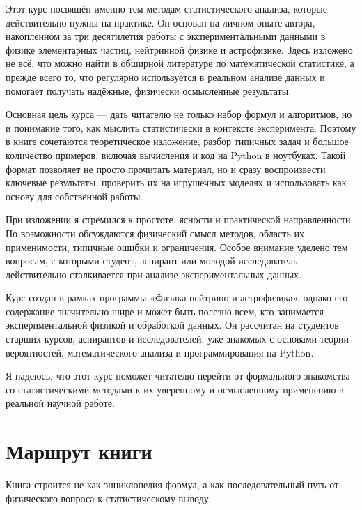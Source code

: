 \documentclass[
  russian,
  letterpaper,
]{scrbook}
\begin{document}
Этот курс посвящён именно тем методам статистического анализа, которые
действительно нужны на практике. Он основан на личном опыте автора,
накопленном за три десятилетия работы с экспериментальными данными в
физике элементарных частиц, нейтринной физике и астрофизике. Здесь
изложено не всё, что можно найти в обширной литературе по математической
статистике, а прежде всего то, что регулярно используется в реальном
анализе данных и помогает получать надёжные, физически осмысленные
результаты.

Основная цель курса --- дать читателю не только набор формул и
алгоритмов, но и понимание того, как мыслить статистически в контексте
эксперимента. Поэтому в книге сочетаются теоретическое изложение, разбор
типичных задач и большое количество примеров, включая вычисления и код
на Python в ноутбуках. Такой формат позволяет не просто прочитать
материал, но и сразу воспроизвести ключевые результаты, проверить их на
игрушечных моделях и использовать как основу для собственной работы.

При изложении я стремился к простоте, ясности и практической
направленности. По возможности обсуждаются физический смысл методов,
область их применимости, типичные ошибки и ограничения. Особое внимание
уделено тем вопросам, с которыми студент, аспирант или молодой
исследователь действительно сталкивается при анализе экспериментальных
данных.

Курс создан в рамках программы «Физика нейтрино и астрофизика», однако
его содержание значительно шире и может быть полезно всем, кто
занимается экспериментальной физикой и обработкой данных. Он рассчитан
на студентов старших курсов, аспирантов и исследователей, уже знакомых с
основами теории вероятностей, математического анализа и программирования
на Python.

Я надеюсь, что этот курс поможет читателю перейти от формального
знакомства со статистическими методами к их уверенному и осмысленному
применению в реальной научной работе.


\chapter*{Маршрут
книги}\label{ux43cux430ux440ux448ux440ux443ux442-ux43aux43dux438ux433ux438}


Книга строится не как энциклопедия формул, а как последовательный путь
от физического вопроса к статистическому выводу.
\end{document}
